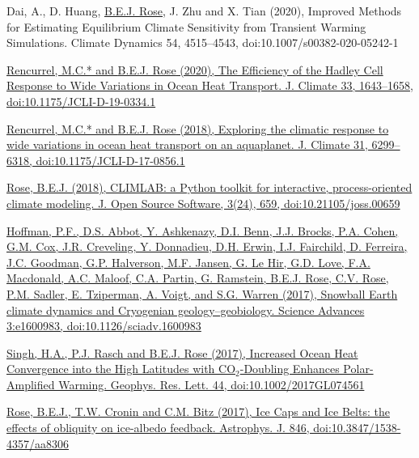 \documentclass[11pt, letterpaper]{article} %
\newcommand{\years}[1]{\marginnote{\scriptsize #1}} %
\newcommand{\publink}{http://www.atmos.albany.edu/facstaff/brose/resources/Publications/}
\begin{document}
\years{2020} 
Dai, A., D. Huang, \underline{B.E.J. Rose}, J. Zhu and X. Tian (2020), Improved Methods for Estimating Equilibrium Climate Sensitivity from Transient Warming Simulations. Climate Dynamics 54, 4515--4543, doi:10.1007/s00382-020-05242-1
\vspace{0.2 cm}

\href{\publink Rencurrel_Rose_JClim2020.pdf}{Rencurrel, M.C.* and \underline{B.E.J. Rose} (2020), The Efficiency of the Hadley Cell Response to Wide Variations in Ocean Heat Transport. J. Climate 33, 1643--1658, doi:10.1175/JCLI-D-19-0334.1}
\vspace{0.2 cm}

\years{2018} 
\href{\publink Rencurrel_Rose_jcli-d-17-0856.1.pdf}{Rencurrel, M.C.* and \underline{B.E.J. Rose} (2018), Exploring the climatic response to wide variations in ocean heat transport on an aquaplanet. J. Climate 31, 6299--6318, doi:10.1175/JCLI-D-17-0856.1} 
\vspace{0.2 cm}

\href{\publink Rose_JOSS2018.pdf}{\underline{Rose, B.E.J.} (2018), CLIMLAB: a Python toolkit for interactive, process-oriented climate modeling. J. Open Source Software, 3(24), 659, doi:10.21105/joss.00659}
\vspace{0.2 cm}

\years{2017} 
\href{http://advances.sciencemag.org/content/3/11/e1600983}{Hoffman, P.F., D.S. Abbot, Y. Ashkenazy, D.I. Benn, J.J. Brocks, P.A. Cohen, G.M. Cox, J.R. Creveling, Y. Donnadieu, D.H. Erwin, I.J. Fairchild, D. Ferreira, J.C. Goodman, G.P. Halverson, M.F. Jansen, G. Le Hir, G.D. Love, F.A. Macdonald, A.C. Maloof, C.A. Partin, G. Ramstein, \underline{B.E.J. Rose}, C.V. Rose, P.M. Sadler, E. Tziperman, A. Voigt, and S.G. Warren (2017), Snowball Earth climate dynamics and Cryogenian geology--geobiology. Science Advances 3:e1600983, doi:10.1126/sciadv.1600983}
\vspace{0.2 cm}

\href{\publink Singh_et_al-2017-Geophysical_Research_Letters-2.pdf}{Singh, H.A., P.J. Rasch and \underline{B.E.J. Rose} (2017), Increased Ocean Heat Convergence into the High Latitudes with CO$_2$-Doubling Enhances Polar-Amplified Warming. Geophys. Res. Lett. 44, doi:10.1002/2017GL074561}
\vspace{0.2 cm}

\href{\publink Rose_2017_ApJ_846_28.pdf}{\underline{Rose, B.E.J.}, T.W. Cronin and C.M. Bitz (2017), Ice Caps and Ice Belts: the effects of obliquity on ice-albedo feedback. Astrophys. J. 846, doi:10.3847/1538-4357/aa8306}
\vspace{0.2 cm}
\end{document}
